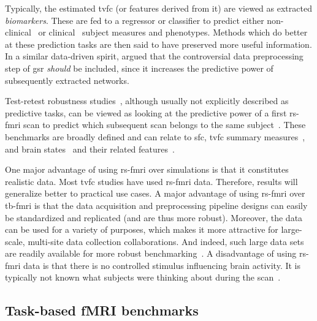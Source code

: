 Typically, the estimated \gls{tvfc} (or features derived from it) are viewed as extracted \emph{biomarkers}.
These are fed to a regressor or classifier to predict either non-clinical~\parencite[see e.g.][]{Taghia2017, Li2019a} or clinical~\parencite[see e.g.][]{Filippi2019, Du2021} subject measures and phenotypes.
Methods which do better at these prediction tasks are then said to have preserved more useful information.
%
In a similar data-driven spirit, \textcite{Li2019a} argued that the controversial data preprocessing step of \gls{gsr} \emph{should} be included, since it increases the predictive power of subsequently extracted networks.

Test-retest robustness studies~\parencite{Noble2019}, although usually not explicitly described as predictive tasks, can be viewed as looking at the predictive power of a first \gls{rs-fmri} scan to predict which subsequent scan belongs to the same subject~\parencite{Fiecas2013, Choe2017, Abrol2017, Zhang2018, Elliott2020}.
These benchmarks are broadly defined and can relate to \gls{sfc}, \gls{tvfc} summary measures~\parencite{Abrol2017, Choe2017}, and brain states~\parencite{Abrol2016} and their related features~\parencite{Abrol2017}.

One major advantage of using \gls{rs-fmri} over simulations is that it constitutes realistic data.
Most \gls{tvfc} studies have used \gls{rs-fmri} data.
Therefore, results will generalize better to practical use cases.
%
A major advantage of using \gls{rs-fmri} over \gls{tb-fmri} is that the data acquisition and preprocessing pipeline designs can easily be standardized and replicated (and are thus more robust).
Moreover, the data can be used for a variety of purposes, which makes it more attractive for large-scale, multi-site data collection collaborations.
And indeed, such large data sets are readily available for more robust benchmarking~\parencite[see e.g.][]{VanEssen2012, Allen2014b}.
%
A disadvantage of using \gls{rs-fmri} data is that there is no controlled stimulus influencing brain activity.
It is typically not known what subjects were thinking about during the scan~\parencite[see also][]{Finn2021}.

\subsection{Task-based fMRI benchmarks}


